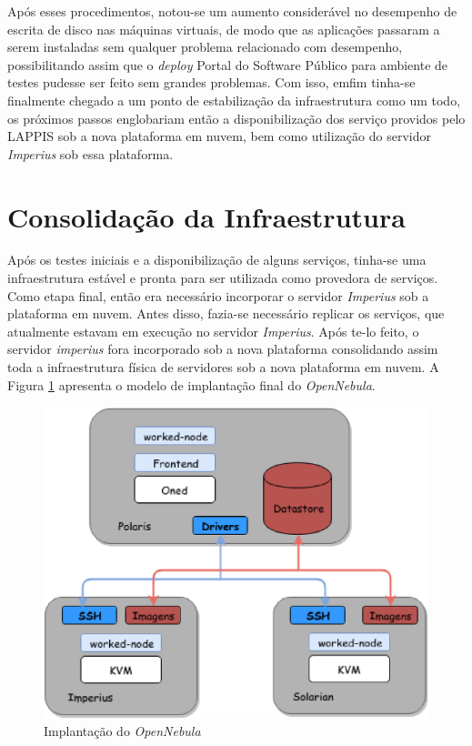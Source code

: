 Após esses procedimentos, notou-se um aumento considerável no desempenho de escrita de disco nas máquinas virtuais, de modo que as aplicações passaram a serem instaladas sem qualquer problema relacionado com desempenho, possibilitando assim que o \textit{deploy}  Portal do Software Público para ambiente de testes pudesse ser feito sem grandes problemas. Com isso, emfim tinha-se finalmente chegado a um ponto de estabilização da infraestrutura como um todo, os próximos passos englobariam então a disponibilização dos serviço providos pelo LAPPIS sob a nova plataforma em nuvem, bem como utilização do servidor \textit{Imperius} sob essa plataforma.  

\section{Consolidação da Infraestrutura}
Após os testes iniciais e a disponibilização de alguns serviços, tinha-se uma infraestrutura estável e pronta para ser utilizada como provedora de serviços. Como etapa final, então era necessário incorporar o servidor \textit{Imperius} sob a plataforma em nuvem. Antes disso, fazia-se necessário replicar os serviços, que atualmente estavam em execução no servidor \textit{Imperius}. Após te-lo feito, o servidor \textit{imperius} fora incorporado sob a nova plataforma consolidando assim toda a infraestrutura física de servidores sob a nova plataforma em nuvem. A Figura \ref{fig:opennebula_lappis} apresenta o modelo de implantação final do \textit{OpenNebula}.

\begin{figure}[!h]
\centering
\includegraphics [keepaspectratio=true,scale=0.53]{figuras/cloud_implation.eps}
\caption{Implantação do \textit{OpenNebula}}
\label{fig:opennebula_lappis}
\end{figure}


